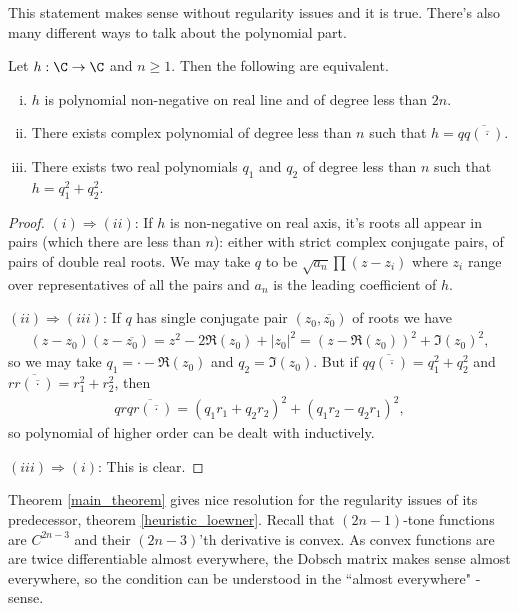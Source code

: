 This statement makes sense without regularity issues and it is true. There's also many different ways to talk about the polynomial part.
\begin{lem}\label{polynomial_lemma}
	Let $h : \C \to \C$ and $n \geq 1$. Then the following are equivalent.
	\begin{enumerate}[(i)]
		\item $h$ is polynomial non-negative on real line and of degree less than $2 n$.
		\item There exists complex polynomial of degree less than $n$ such that $h = q \overline{q(\overline{\cdot})}$.
		\item There exists two real polynomials $q_{1}$ and $q_{2}$ of degree less than $n$ such that $h = q_{1}^2 + q_{2}^2$.
	\end{enumerate}
\end{lem}
\begin{proof}
	$(i) \Rightarrow (ii)$: If $h$ is non-negative on real axis, it's roots all appear in pairs (which there are less than $n$): either with strict complex conjugate pairs, of pairs of double real roots. We may take $q$ to be $\sqrt{a_{n}}\prod (z - z_{i})$ where $z_{i}$ range over representatives of all the pairs and $a_{n}$ is the leading coefficient of $h$.

	$(ii) \Rightarrow (iii)$: If $q$ has single conjugate pair $(z_{0}, \overline{z_{0}})$ of roots we have
	\begin{align*}
		(z - z_{0}) (z - \overline{z_{0}}) = z^2 - 2 \Re(z_{0}) + |z_{0}|^2 = (z - \Re(z_{0}))^2 + \Im(z_{0})^2,
	\end{align*}
	so we may take $q_{1} = \cdot - \Re(z_{0})$ and $q_{2} = \Im(z_{0})$. But if $ q \overline{q(\overline{\cdot})} = q_{1}^2 + q_{2}^2$ and $ r \overline{r(\overline{\cdot})} = r_{1}^2 + r_{2}^2$, then
	\begin{align*}
		q r \overline{q r(\overline{\cdot})} = (q_{1} r_{1} + q_{2} r_{2})^2 + (q_{1} r_{2} - q_{2} r_{1})^2,
	\end{align*}
	so polynomial of higher order can be dealt with inductively.

	$(iii) \Rightarrow (i)$: This is clear.
\end{proof}

Theorem \ref{main_theorem} gives nice resolution for the regularity issues of its predecessor, theorem \ref{heuristic_loewner}. Recall that $(2 n - 1)$-tone functions are $C^{2 n - 3}$ and their $(2 n - 3)$'th derivative is convex. As convex functions are are twice differentiable almost everywhere, the Dobsch matrix makes sense almost everywhere, so the condition can be understood in the ``almost everywhere" -sense.

